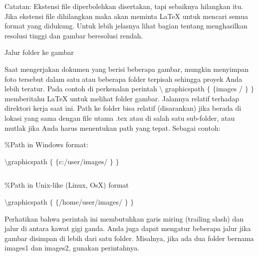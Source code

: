 \vspace{12pt}
\vspace{12pt}
\noindent 
Catatan: Ekstensi file diperbolehkan disertakan, tapi sebaiknya hilangkan itu. Jika ekstensi file dihilangkan maka akan meminta LaTeX untuk mencari semua format yang didukung. Untuk lebih jelasnya lihat bagian tentang menghasilkan resolusi tinggi dan gambar beresolusi rendah. \par
\vspace{12pt}
\vspace{12pt}
\noindent 
Jalur folder ke gambar \par
\vspace{12pt}
\noindent 
Saat mengerjakan dokumen yang berisi beberapa gambar, mungkin menyimpan foto tersebut dalam satu atau beberapa folder terpisah sehingga proyek Anda lebih teratur. Pada contoh di perkenalan perintah  $  \setminus  $ graphicspath  $  \{  $ $  \{  $images / $  \}  $ $  \}  $ memberitahu LaTeX untuk melihat folder gambar. Jalannya relatif terhadap direktori kerja saat ini. Path ke folder bisa relatif (disarankan) jika berada di lokasi yang sama dengan file utama .tex atau di salah satu sub-folder, atau mutlak jika Anda harus menentukan path yang tepat. Sebagai contoh: \par
\vspace{12pt}
\vspace{12pt}
\vspace{12pt}
\vspace{12pt}
\noindent 
 $  \%  $Path in Windows format: \par
\vspace{12pt}
\noindent 
 $  \setminus  $graphicspath $  \{  $  $  \{  $c:/user/images/ $  \}  $  $  \}  $ \par
\noindent 
 $  $ \par
\noindent 
 $  \%  $Path in Unix-like (Linux, OsX) format \par
\vspace{12pt}
\noindent 
 $  \setminus  $graphicspath $  \{  $  $  \{  $/home/user/images/ $  \}  $  $  \}  $ \par
\vspace{12pt}
\vspace{12pt}
\vspace{12pt}
\noindent 
Perhatikan bahwa perintah ini membutuhkan garis miring (trailing slash) dan jalur di antara kawat gigi ganda. Anda juga dapat mengatur beberapa jalur jika gambar disimpan di lebih dari satu folder. Misalnya, jika ada dua folder bernama images1 dan images2, gunakan perintahnya. \par
